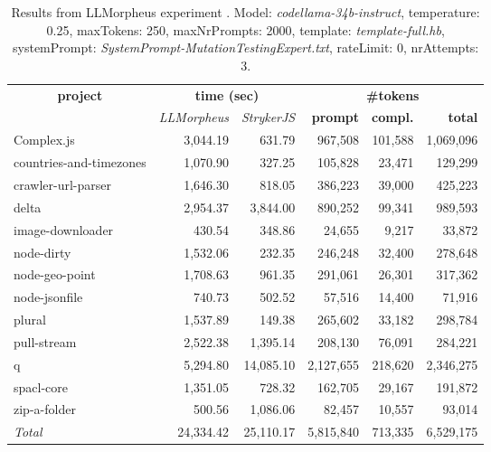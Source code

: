 
\begin{table*}[hbt!]
\centering
{\scriptsize
\begin{tabular}{l||r|r|r|r|r}
\multicolumn{1}{c|}{\bf project} & \multicolumn{2}{|c|}{\bf time (sec)} & \multicolumn{3}{|c|}{\bf \#tokens} \\
               & {\it LLMorpheus} & {\it StrykerJS} & {\bf prompt} & {\bf compl.} & {\bf total} \\
\hline
  Complex.js & 3,044.19 & 631.79 & 967,508 & 101,588 & 1,069,096 \\ 
countries-and-timezones & 1,070.90 & 327.25 & 105,828 & 23,471 & 129,299 \\ 
crawler-url-parser & 1,646.30 & 818.05 & 386,223 & 39,000 & 425,223 \\ 
delta & 2,954.37 & 3,844.00 & 890,252 & 99,341 & 989,593 \\ 
image-downloader & 430.54 & 348.86 & 24,655 & 9,217 & 33,872 \\ 
node-dirty & 1,532.06 & 232.35 & 246,248 & 32,400 & 278,648 \\ 
node-geo-point & 1,708.63 & 961.35 & 291,061 & 26,301 & 317,362 \\ 
node-jsonfile & 740.73 & 502.52 & 57,516 & 14,400 & 71,916 \\ 
plural & 1,537.89 & 149.38 & 265,602 & 33,182 & 298,784 \\ 
pull-stream & 2,522.38 & 1,395.14 & 208,130 & 76,091 & 284,221 \\ 
q & 5,294.80 & 14,085.10 & 2,127,655 & 218,620 & 2,346,275 \\ 
spacl-core & 1,351.05 & 728.32 & 162,705 & 29,167 & 191,872 \\ 
zip-a-folder & 500.56 & 1,086.06 & 82,457 & 10,557 & 93,014 \\ 
\hline
  \textit{Total} & 24,334.42 & 25,110.17 & 5,815,840 & 713,335 & 6,529,175 \\
  \end{tabular}
  }
  \\[2mm]
  \caption{Results from LLMorpheus experiment .
    Model: \textit{codellama-34b-instruct}, 
    temperature: 0.25, 
    maxTokens: 250, 
    maxNrPrompts: 2000, 
    template: \textit{template-full.hb}, 
    systemPrompt: \textit{SystemPrompt-MutationTestingExpert.txt}, 
    rateLimit: 0, 
    nrAttempts: 3.  
  }
  \label{table:Cost:run348:codellama-34b-instruct:template-full.hb:0.25}
\end{table*}